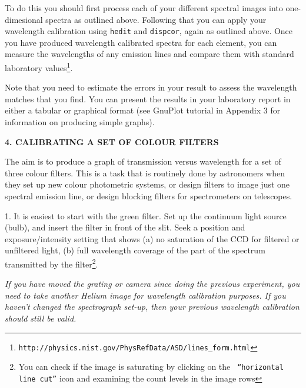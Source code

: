 \documentclass[12pt]{article}
\begin{document}
\noindent
To do this you should first process each of your different spectral images into
one-dimesional spectra as outlined above. Following that you can apply
your wavelength calibration using {\tt hedit} and {\tt dispcor}, again
as outlined above. Once you have produced wavelength calibrated
spectra for each element, you can measure the wavelengths of any
emission lines and compare them with standard laboratory values\footnote{
{\tt http://physics.nist.gov/PhysRefData/ASD/lines\_form.html}}. 

Note that you need to estimate the errors in your result to assess the wavelength matches
that you find. You can present the results in your laboratory report
in either a tabular or graphical format (see GnuPlot tutorial in
Appendix 3 for information on producing simple graphs).


{\bf 4. CALIBRATING A SET OF COLOUR FILTERS}

The aim is to produce a graph of transmission versus wavelength 
for a set of three colour filters. This is a task that is routinely
done by astronomers when they set up new colour photometric systems,
or design filters to image just one spectral emission line, or design
blocking filters for spectrometers on telescopes.

1. It is easiest to start with the green filter. Set up the continuum
light source (bulb), and insert the filter in front of the slit. Seek
a position and exposure/intensity setting that shows (a) no saturation
of the CCD for filtered or unfiltered light, (b) full wavelength
coverage of the part of the spectrum transmitted by the filter\footnote{
You can check if the image is saturating by clicking on the {\tt
  ``horizontal line cut''} icon and examining the count levels in the image rows}.

   {\it If you have moved the grating or camera since doing the previous
   experiment, you need to take another Helium image for
   wavelength calibration purposes. If you haven't changed the
   spectrograph set-up, then your previous wavelength calibration
   should still be valid.}
\end{document}
